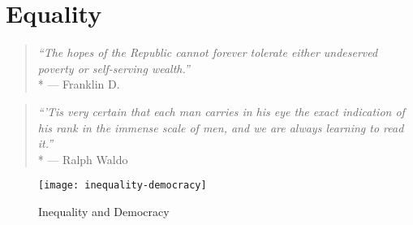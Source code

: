 \section{Equality}

\begin{quote}
	\emph{``The hopes of the Republic cannot forever tolerate either undeserved poverty or self-serving wealth.''}\\*
	--- Franklin D.
\end{quote}

\begin{quote}
	\emph{``'Tis very certain that each man carries in his eye the exact indication of his rank in the immense scale of men, and we are always learning to read it.''}\\*
	--- Ralph Waldo \cite{Emerson1860}
\end{quote}

 \begin{figure}[htbp]
	\centering
	\texttt{[image: inequality-democracy]}
	\caption{Inequality and Democracy}
	\label{fig:inequality-democracy}
\end{figure}





